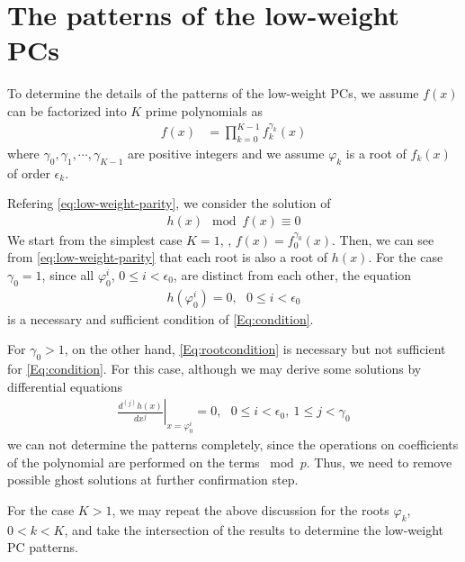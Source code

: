 \section{The patterns of the low-weight PCs}
\label{sec3}
To determine the details of the patterns of the low-weight PCs, we assume $f(x)$ can be factorized into $K$ prime polynomials as 
\begin{align}
f(x)&=\prod_{k=0}^{K-1}f_k^{\gamma_k}(x)
\end{align}
where $\gamma_0,\gamma_1,\cdots,\gamma_{K-1}$ are positive integers and we assume $\varphi_k$ is a root of $f_{k}(x)$ of order $\epsilon_k$.

Refering \eqref{eq:low-weight-parity}, we consider the solution of
\begin{align}
	h(x) \mod f(x) \equiv 0
	\label{Eq:condition}
\end{align}
%
We start from the simplest case $K=1$, \ie, $f(x) = f_0^{\gamma_0}(x)$. Then, we can see from \eqref{eq:low-weight-parity} that each root is also a root of $h(x)$. For the case $\gamma_0 = 1$, since all $\varphi_0^i$, $0 \leq i < \epsilon_0$, are distinct from each other, the equation
\begin{align}
	h(\varphi_0^i)=0,~~~ 0 \leq i < \epsilon_0
	\label{Eq:rootcondition}
\end{align}
is a necessary and sufficient condition of \eqref{Eq:condition}. 

For $\gamma_0 > 1$, on the other hand, \eqref{Eq:rootcondition} is necessary but not sufficient for \eqref{Eq:condition}. For this case, although we may derive some solutions by differential equations
\begin{align}
\left.\frac{d^{(j)}h(x)}{d x^j}\right|_{x=\varphi_0^i}=0,~~~0 \leq i < \epsilon_0,~1 \leq j < \gamma_0
\label{Eq:differential}
\end{align}
we can not determine the patterns completely, since the operations on coefficients of the polynomial are performed on the terms $\bmod p$. Thus, we need to remove possible ghost solutions at further confirmation step.

For the case $K>1$, we may repeat the above discussion for the roots $\varphi_k$, $0 < k < K$, and take the intersection of the results to determine the low-weight PC patterns.

